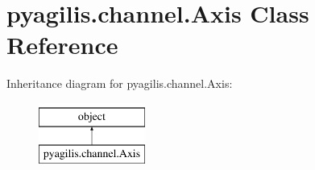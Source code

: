 \hypertarget{classpyagilis_1_1channel_1_1_axis}{}\section{pyagilis.\+channel.\+Axis Class Reference}
\label{classpyagilis_1_1channel_1_1_axis}
Inheritance diagram for pyagilis.\+channel.\+Axis\+:\begin{figure}[H]
\begin{center}
\leavevmode
\includegraphics[height=2.000000cm]{classpyagilis_1_1channel_1_1_axis}
\end{center}
\end{figure}
